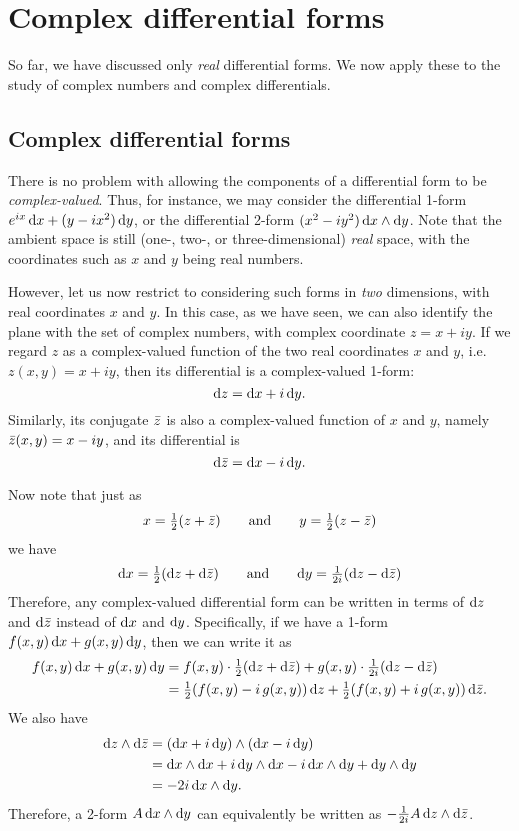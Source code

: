 \ifdefined\inmaster\else\def\subonly{\jobname}\fi

\chapter{Complex differential forms}

So far, we have discussed only \emph{real} differential forms.
We now apply these to the study of complex numbers and complex differentials.

\section{Complex differential forms}
\label{sec:complex-forms}

There is no problem with allowing the components of a differential form to be \emph{complex-valued}.
Thus, for instance, we may consider the differential 1-form $e^{ix} \,{\mathrm{d} x} + (y-ix^2)\,{\mathrm{d} y}$, or the differential 2-form $(x^2- i y^2)\,{\mathrm{d} x}\wedge{\ensuremath{\mathrm{d} y}}$.
Note that the ambient space is still (one-, two-, or three-dimensional) \emph{real} space, with the coordinates such as $x$ and $y$ being real numbers.

However, let us now restrict to considering such forms in \emph{two} dimensions, with real coordinates $x$ and $y$.
In this case, as we have seen, we can also identify the plane with the set of complex numbers, with complex coordinate $z = x+iy$.
If we regard $z$ as a complex-valued function of the two real coordinates $x$ and $y$, i.e.\ $z(x,y) = x+iy$, then its differential is a complex-valued 1-form:
\[ {\mathrm{d} z} = {\mathrm{d} x} + i \,{\mathrm{d} y}. \]
Similarly, its conjugate $\bar{z}$ is also a complex-valued function of $x$ and $y$, namely $\bar{z}(x,y) = x-iy$, and its differential is
\[ {\mathrm{d} \bar{z}} = {\mathrm{d} x} - i\, {\mathrm{d} y}. \]

Now note that just as
\[ x = \textstyle\frac{1}{2}(z+\bar{z}) \qquad\text{and}\qquad y = \textstyle\frac{1}{2}(z-\bar{z}) \]
we have
\[ {\mathrm{d} x} = \textstyle\frac{1}{2}({\mathrm{d} z}+{\mathrm{d} \bar{z}}) \qquad\text{and}\qquad {\ensuremath{\mathrm{d} y}} = \textstyle\frac{1}{2i}({\mathrm{d} z}-{\mathrm{d} \bar{z}}) \]
Therefore, any complex-valued differential form can be written in terms of ${\mathrm{d} z}$ and ${\mathrm{d} \bar{z}}$ instead of ${\mathrm{d} x}$ and ${\mathrm{d} y}$.
Specifically, if we have a 1-form $f(x,y) \,{\mathrm{d} x} + g(x,y) \,{\mathrm{d} y}$, then we can write it as
\begin{align*}
  f(x,y) \,{\mathrm{d} x} + g(x,y) \,{\mathrm{d} y}
  &= f(x,y)\cdot\textstyle\frac{1}{2}({\mathrm{d} z}+{\mathrm{d} \bar{z}}) +  g(x,y) \cdot\textstyle\frac{1}{2i}({\mathrm{d} z}-{\mathrm{d} \bar{z}})\\
  &= \textstyle\frac{1}{2} (f(x,y) -i\, g(x,y))\,{\mathrm{d} z} + \textstyle\frac{1}{2} (f(x,y) +i\, g(x,y))\,{\mathrm{d} \bar{z}}.
\end{align*}
We also have
\begin{align*}
  {\ensuremath{\mathrm{d} z}} \wedge{\ensuremath{\mathrm{d} \bar{z}}} &= ({\mathrm{d} x} + i \,{\mathrm{d} y}) \wedge ({\mathrm{d} x} - i \,{\mathrm{d} y})\\
  &= {\mathrm{d} x}\wedge{\ensuremath{\mathrm{d} x}} + i\,{\mathrm{d} y}\wedge{\ensuremath{\mathrm{d} x}} - i\,{\mathrm{d} x}\wedge{\ensuremath{\mathrm{d} y}} + {\mathrm{d} y}\wedge{\ensuremath{\mathrm{d} y}}\\
  &= -2i\, {\mathrm{d} x}\wedge{\ensuremath{\mathrm{d} y}}.
\end{align*}
Therefore, a 2-form $A\,{\mathrm{d} x}\wedge{\ensuremath{\mathrm{d} y}}$ can equivalently be written as $-\textstyle\frac{1}{2i} A\, {\mathrm{d} z}\wedge{\ensuremath{\mathrm{d} \bar{z}}}$.

